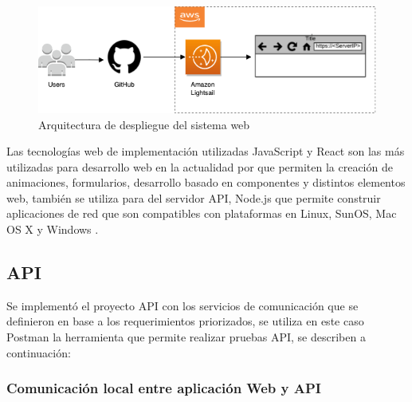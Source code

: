 \documentclass[12pt]{article}
\begin{document}
\begin{figure}[ht]
\centering
\includegraphics[scale=0.45]{imag/Lightsail.png}
\caption{Arquitectura de despliegue del sistema web }
\label{16}
\end{figure}
\FloatBarrier


Las tecnologías web de implementación utilizadas JavaScript y React son las más utilizadas para desarrollo web en la actualidad por que permiten la creación de animaciones, formularios, desarrollo basado en componentes y distintos elementos web, también se utiliza para del servidor API, Node.js que permite construir aplicaciones de red que son compatibles con plataformas en Linux, SunOS, Mac OS X y Windows \cite{52} \cite{53}.






\subsection{API}

Se implementó el proyecto API con los servicios de comunicación que se definieron en base a los requerimientos priorizados, se utiliza en este caso Postman la herramienta que permite realizar pruebas API,  se describen a continuación: 


\subsubsection{Comunicación local entre aplicación Web y API}
\end{document}
